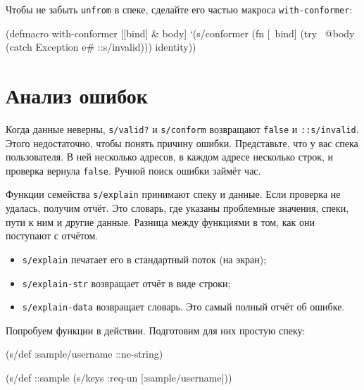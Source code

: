 Чтобы не забыть \verb|unfrom| в спеке, сделайте его частью макроса
\verb|with-conformer|:

\begin{english}
  \begin{clojure}
(defmacro with-conformer
  [[bind] & body]
  `(s/conformer
    (fn [~bind]
      (try
        ~@body
        (catch Exception e#
          ::s/invalid)))
    identity))
  \end{clojure}
\end{english}

\section{Анализ ошибок}


\label{spec-explain}

Когда данные неверны, \verb|s/valid?| и \verb|s/conform| возвращают
\verb|false| и \verb|::s/invalid|. Этого недостаточно, чтобы понять причину
ошибки. Представьте, что у вас спека пользователя. В ней несколько адресов, в
каждом адресе несколько строк, и проверка вернула \verb|false|. Ручной поиск
ошибки займёт час.

Функции семейства \verb|s/explain| принимают спеку и данные. Если проверка не
удалась, получим отчёт. Это словарь, где указаны проблемные значения, спеки,
пути к ним и другие данные. Разница между функциями в том, как они поступают с
отчётом.

\begin{itemize}


\item
  \verb|s/explain| печатает его в стандартный поток (на экран);

\item
  \verb|s/explain-str| возвращает отчёт в виде строки;

\item
  \verb|s/explain-data| возвращает словарь. Это самый полный отчёт об ошибке.

\end{itemize}

Попробуем функции в действии. Подготовим для них простую спеку:

\begin{english}
  \begin{clojure}
(s/def :sample/username ::ne-string)

(s/def ::sample
  (s/keys :req-un [:sample/username]))
  \end{clojure}
\end{english}

